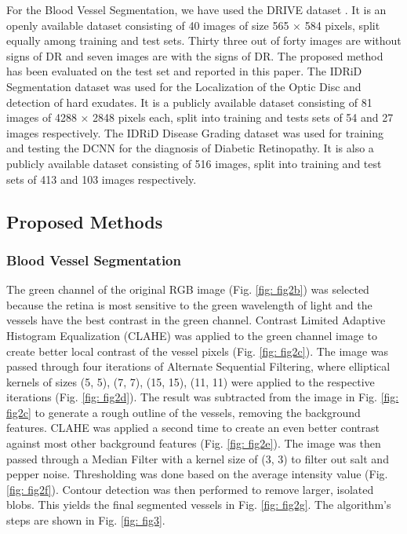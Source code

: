 \documentclass{svproc}
\begin{document}
For the Blood Vessel Segmentation, we have used the DRIVE dataset \cite{drive} . It is an openly available dataset consisting of 40 images of size 565 × 584 pixels, split equally among training and test sets. Thirty three out of forty images are without signs of DR and seven images are with the signs of DR. The proposed method has been evaluated on the test set and reported in this paper. The IDRiD \cite{idrid} Segmentation dataset was used for the Localization of the Optic Disc and detection of hard exudates. It is a publicly available dataset consisting of 81 images of 4288 × 2848 pixels each, split into training and tests sets of 54 and 27 images respectively. The IDRiD Disease Grading dataset was used for training and testing the DCNN for the diagnosis of Diabetic Retinopathy. It is also a publicly available dataset consisting of 516 images, split into training and test sets of 413 and 103 images respectively.


\subsection{Proposed Methods}


\subsubsection{Blood Vessel Segmentation}

The green channel of the original RGB image (Fig. \ref{fig: fig2b}) was selected because the retina is most sensitive to the green wavelength of light and the vessels have the best contrast in the green channel. Contrast Limited Adaptive Histogram Equalization (CLAHE) was applied to the green channel image to create better local contrast of the vessel pixels (Fig. \ref{fig: fig2c}). The image was passed through four iterations of Alternate Sequential Filtering, where elliptical kernels of sizes (5, 5), (7, 7), (15, 15), (11, 11) were applied to the respective iterations (Fig. \ref{fig: fig2d}). The result was subtracted from the image in Fig. \ref{fig: fig2c} to generate a rough outline of the vessels, removing the background features. CLAHE was applied a second time to create an even better contrast against most other background features (Fig. \ref{fig: fig2e}). The image was then passed through a Median Filter with a kernel size of (3, 3) to filter out salt and pepper noise. Thresholding was done based on the average intensity value (Fig. \ref{fig: fig2f}). Contour detection was then performed to remove larger, isolated blobs. This yields the final segmented vessels in Fig. \ref{fig: fig2g}. The algorithm's steps are shown in Fig. \ref{fig: fig3}.
\end{document}
